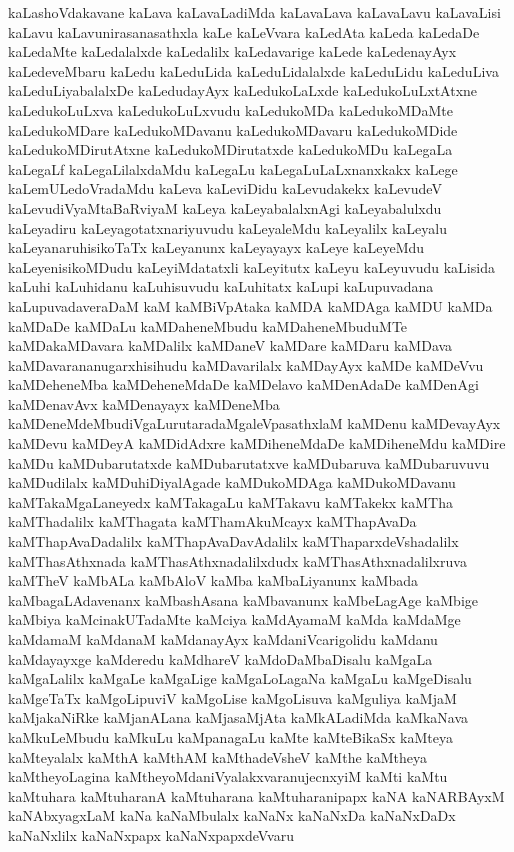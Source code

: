 {kaLashoVdakavane
kaLava
kaLavaLadiMda
kaLavaLava
kaLavaLavu
kaLavaLisi
kaLavu
kaLavunirasanasathxla
kaLe
kaLeVvara
kaLedAta
kaLeda
kaLedaDe
kaLedaMte
kaLedalalxde
kaLedalilx
kaLedavarige
kaLede
kaLedenayAyx
kaLedeveMbaru
kaLedu
kaLeduLida
kaLeduLidalalxde
kaLeduLidu
kaLeduLiva
kaLeduLiyabalalxDe
kaLedudayAyx
kaLedukoLaLxde
kaLedukoLuLxtAtxne
kaLedukoLuLxva
kaLedukoLuLxvudu
kaLedukoMDa
kaLedukoMDaMte
kaLedukoMDare
kaLedukoMDavanu
kaLedukoMDavaru
kaLedukoMDide
kaLedukoMDirutAtxne
kaLedukoMDirutatxde
kaLedukoMDu
kaLegaLa
kaLegaLf
kaLegaLilalxdaMdu
kaLegaLu
kaLegaLuLaLxnanxkakx
kaLege
kaLemULedoVradaMdu
kaLeva
kaLeviDidu
kaLevudakekx
kaLevudeV
kaLevudiVyaMtaBaRviyaM
kaLeya
kaLeyabalalxnAgi
kaLeyabalulxdu
kaLeyadiru
kaLeyagotatxnariyuvudu
kaLeyaleMdu
kaLeyalilx
kaLeyalu
kaLeyanaruhisikoTaTx
kaLeyanunx
kaLeyayayx
kaLeye
kaLeyeMdu
kaLeyenisikoMDudu
kaLeyiMdatatxli
kaLeyitutx
kaLeyu
kaLeyuvudu
kaLisida
kaLuhi
kaLuhidanu
kaLuhisuvudu
kaLuhitatx
kaLupi
kaLupuvadana
kaLupuvadaveraDaM
kaM
kaMBiVpAtaka
kaMDA
kaMDAga
kaMDU
kaMDa
kaMDaDe
kaMDaLu
kaMDaheneMbudu
kaMDaheneMbuduMTe
kaMDakaMDavara
kaMDalilx
kaMDaneV
kaMDare
kaMDaru
kaMDava
kaMDavarananugarxhisihudu
kaMDavarilalx
kaMDayAyx
kaMDe
kaMDeVvu
kaMDeheneMba
kaMDeheneMdaDe
kaMDelavo
kaMDenAdaDe
kaMDenAgi
kaMDenavAvx
kaMDenayayx
kaMDeneMba
kaMDeneMdeMbudiVgaLurutaradaMgaleVpasathxlaM
kaMDenu
kaMDevayAyx
kaMDevu
kaMDeyA
kaMDidAdxre
kaMDiheneMdaDe
kaMDiheneMdu
kaMDire
kaMDu
kaMDubarutatxde
kaMDubarutatxve
kaMDubaruva
kaMDubaruvuvu
kaMDudilalx
kaMDuhiDiyalAgade
kaMDukoMDAga
kaMDukoMDavanu
kaMTakaMgaLaneyedx
kaMTakagaLu
kaMTakavu
kaMTakekx
kaMTha
kaMThadalilx
kaMThagata
kaMThamAkuMcayx
kaMThapAvaDa
kaMThapAvaDadalilx
kaMThapAvaDavAdalilx
kaMThaparxdeVshadalilx
kaMThasAthxnada
kaMThasAthxnadalilxdudx
kaMThasAthxnadalilxruva
kaMTheV
kaMbALa
kaMbAloV
kaMba
kaMbaLiyanunx
kaMbada
kaMbagaLAdavenanx
kaMbashAsana
kaMbavanunx
kaMbeLagAge
kaMbige
kaMbiya
kaMcinakUTadaMte
kaMciya
kaMdAyamaM
kaMda
kaMdaMge
kaMdamaM
kaMdanaM
kaMdanayAyx
kaMdaniVcarigolidu
kaMdanu
kaMdayayxge
kaMderedu
kaMdhareV
kaMdoDaMbaDisalu
kaMgaLa
kaMgaLalilx
kaMgaLe
kaMgaLige
kaMgaLoLagaNa
kaMgaLu
kaMgeDisalu
kaMgeTaTx
kaMgoLipuviV
kaMgoLise
kaMgoLisuva
kaMguliya
kaMjaM
kaMjakaNiRke
kaMjanALana
kaMjasaMjAta
kaMkALadiMda
kaMkaNava
kaMkuLeMbudu
kaMkuLu
kaMpanagaLu
kaMte
kaMteBikaSx
kaMteya
kaMteyalalx
kaMthA
kaMthAM
kaMthadeVsheV
kaMthe
kaMtheya
kaMtheyoLagina
kaMtheyoMdaniVyalakxvaranujecnxyiM
kaMti
kaMtu
kaMtuhara
kaMtuharanA
kaMtuharana
kaMtuharanipapx
kaNA
kaNARBAyxM
kaNAbxyagxLaM
kaNa
kaNaMbulalx
kaNaNx
kaNaNxDa
kaNaNxDaDx
kaNaNxlilx
kaNaNxpapx
kaNaNxpapxdeVvaru
}
